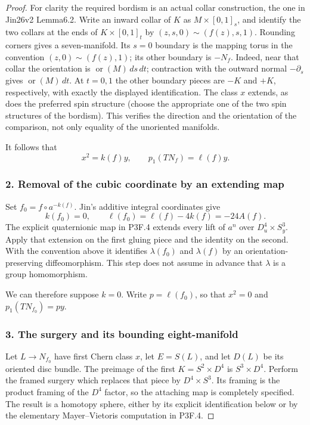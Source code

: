 \begin{proof}
For clarity the required bordism is an actual collar construction, the one in Jin26v2 Lemma6.2. Write an inward collar of \(K\) as \(M\times[0,1]_s\), and identify the two collars at the ends of \(K\times[0,1]_t\) by \((z,s,0)\sim(f(z),s,1)\). Rounding corners gives a seven-manifold. Its \(s=0\) boundary is the mapping torus in the convention \((z,0)\sim(f(z),1)\); its other boundary is \(-N_f\). Indeed, near that collar the orientation is \(\operatorname{or}(M)\,ds\,dt\); contraction with the outward normal \(-\partial_s\) gives \(\operatorname{or}(M)\,dt\). At \(t=0,1\) the other boundary pieces are \(-K\) and \(+K\), respectively, with exactly the displayed identification. The class \(x\) extends, as does the preferred spin structure (choose the appropriate one of the two spin structures of the bordism). This verifies the direction and the orientation of the comparison, not only equality of the unoriented manifolds.

It follows that \[
 x^2=k(f)y,\qquad p_1(TN_f)=\ell(f)y.                 \tag{P3F.22.2}
\]

\subsubsection{2. Removal of the cubic coordinate by an extending map}\label{removal-of-the-cubic-coordinate-by-an-extending-map}

Set \(f_0=f\circ a^{-k(f)}\). Jin's additive integral coordinates give \[
 k(f_0)=0,\qquad \ell(f_0)=\ell(f)-4k(f)=-24A(f).
\] The explicit quaternionic map in P3F.4 extends every lift of \(a^n\) over \(D^4_u\times S^3_y\). Apply that extension on the first gluing piece and the identity on the second. With the convention above it identifies \(\lambda(f_0)\) and \(\lambda(f)\) by an orientation-preserving diffeomorphism. This step does not assume in advance that \(\lambda\) is a group homomorphism.

We can therefore suppose \(k=0\). Write \(p=\ell(f_0)\), so that \(x^2=0\) and \(p_1(TN_{f_0})=py\).

\subsubsection{3. The surgery and its bounding eight-manifold}\label{the-surgery-and-its-bounding-eight-manifold}

Let \(L\to N_{f_0}\) have first Chern class \(x\), let \(E=S(L)\), and let \(D(L)\) be its oriented disc bundle. The preimage of the first \(K=S^2\times D^4\) is \(S^3\times D^4\). Perform the framed surgery which replaces that piece by \(D^4\times S^3\). Its framing is the product framing of the \(D^4\) factor, so the attaching map is completely specified. The result is a homotopy sphere, either by its explicit identification below or by the elementary Mayer--Vietoris computation in P3F.4.


\end{proof}
